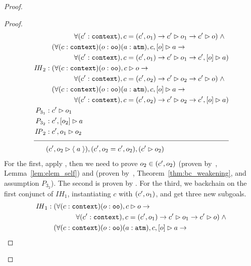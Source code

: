 \begin{proof}
\begin{proof}
\begin{align*}
& \qquad\qquad \forall (\inddyncon{} : \sltm{context}), c = (\inddyncon{}, o_1) \rightarrow \seqsl[\inddyncon{}]{o_1} \rightarrow \seqsl[\inddyncon{}]{o}) \; \wedge \\
& \;\;\; (\forall (c : \sltm{context}) (o : \sltm{oo}) (a : \sltm{atm}), \bchsl[c]{o}{a} \rightarrow \\
& \qquad\qquad \forall (\inddyncon{} : \sltm{context}), c = (\inddyncon{}, o_1) \rightarrow \seqsl[\inddyncon{}]{o_1} \rightarrow \bchsl[\inddyncon{}]{o}{a}) \\
\mathit{IH}_2 &: (\forall (c : \sltm{context}) (o : \sltm{oo}), \seqsl[c]{o} \rightarrow \\
& \qquad\qquad \forall (\inddyncon{} : \sltm{context}), c = (\inddyncon{}, o_2) \rightarrow \seqsl[\inddyncon{}]{o_2} \rightarrow \seqsl[\inddyncon{}]{o}) \; \wedge \\
& \;\;\; (\forall (c : \sltm{context}) (o : \sltm{oo}) (a : \sltm{atm}), \bchsl[c]{o}{a} \rightarrow \\
& \qquad\qquad \forall (\inddyncon{} : \sltm{context}), c = (\inddyncon{}, o_2) \rightarrow \seqsl[\inddyncon{}]{o_2} \rightarrow \bchsl[\inddyncon{}]{o}{a}) \\
P_{3_1} &: \seqsl[\inddyncon{}]{o_1} \\
P_{3_2} &: \bchsl[\inddyncon{}]{o_2}{a} \\
\mathit{IP}_2 &: \seqsl[\inddyncon{} , o_1]{o_2} \\[\pfshift{}]
\cline{1-2}
& (\seqsl[\inddyncon{} , o_2]{\atom{a}}), (\inddyncon{} , o_2 = \inddyncon{} , o_2), (\seqsl[\inddyncon{}]{o_2})
\end{align*}
For the first, apply \rlnmsinit{}, then we need to prove $o_2 \in (c'{} , o_2)$ (proven by~, Lemma~\ref{lem:elem_self}) and  (proven by~, Theorem~\ref{thm:bc_weakening}, and assumption $P_{3_2}$). The second is proven by . For the third, we backchain on the first conjunct of $\mathit{IH}_1$, instantiating $c$ with $(c'{} , o_1)$, and get three new subgoals.
\begin{align*}
\mathit{IH}_1 &: (\forall (c : \sltm{context}) (o : \sltm{oo}), \seqsl[c]{o} \rightarrow \\
& \qquad\qquad \forall (\inddyncon{} : \sltm{context}), c = (\inddyncon{}, o_1) \rightarrow \seqsl[\inddyncon{}]{o_1} \rightarrow \seqsl[\inddyncon{}]{o}) \; \wedge \\
& \;\;\; (\forall (c : \sltm{context}) (o : \sltm{oo}) (a : \sltm{atm}), \bchsl[c]{o}{a} \rightarrow \\

\end{align*}
\end{proof}
\end{proof}
